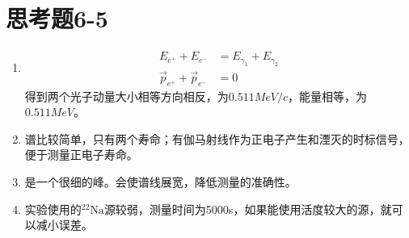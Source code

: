 \documentclass{article}
\begin{document}
    \section{思考题6-5}
    \begin{enumerate}
        \item \begin{equation}
            \begin{aligned}
                E_{e^+} + E_{e^-} &= E_{\gamma_1} + E_{\gamma_2}\\
                \vec{p}_{e^+} + \vec{p}_{e^-} &= 0 
            \end{aligned}
        \end{equation}
        得到两个光子动量大小相等方向相反，为$0.511\si{MeV}/c$，能量相等，为$0.511\si{MeV}$。
        \item 谱比较简单，只有两个寿命；有伽马射线作为正电子产生和湮灭的时标信号，便于测量正电子寿命。
        \item 是一个很细的峰。会使谱线展宽，降低测量的准确性。
        \item 实验使用的$^{22}\text{Na}$源较弱，测量时间为5000s，如果能使用活度较大的源，就可以减小误差。
    \end{enumerate}
\end{document}
